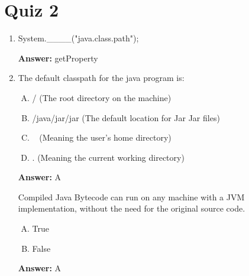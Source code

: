 \documentclass[12pt]{article}
\begin{document}
\bigskip

\section{Quiz 2}

\bigskip

\begin{enumerate}[1.]
    \item

    System.\_\_\_\_("java.class.path");

    \bigskip

    \textbf{Answer:} getProperty

    \item

    The default classpath for the java program is:

    \bigskip

    \begin{enumerate}[A.]
        \item / (The root directory on the machine)
        \item /java/jar/jar (The default location for Jar Jar files)
        \item ~ (Meaning the user's home directory)
        \item . (Meaning the current working directory)
    \end{enumerate}

    \bigskip

    \textbf{Answer:} A


    Compiled Java Bytecode can run on any machine with a JVM implementation,
    without the need for the original source code.

    \begin{enumerate}[A.]
        \item True
        \item False
    \end{enumerate}

    \bigskip

    \textbf{Answer:} A


\end{enumerate}
\end{document}
